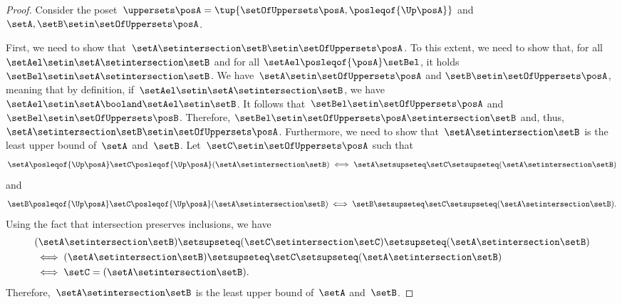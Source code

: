 \begin{proof}
    Consider the poset~$\uppersets \posA=\tup{\setOfUppersets \posA,{{\posleqof{\Up \posA}}}}$ and~$\setA,\setB\setin \setOfUppersets \posA$.

    First, we need to show that~$\setA\setintersection \setB\setin \setOfUppersets \posA$. To this extent, we need to show that, for all $\setAel \setin \setA\setintersection \setB$ and for all $\setAel \posleqof{\posA} \setBel$, it holds $\setBel \setin \setA\setintersection \setB$.
    We have~$\setA \setin \setOfUppersets \posA$ and $\setB\setin \setOfUppersets \posA$, meaning that by definition, if~$\setAel\setin \setA\setintersection \setB$, we have~$\setAel \setin \setA \booland \setAel \setin \setB$.
    It follows that~$\setBel \setin \setOfUppersets \posA$ and $\setBel \setin \setOfUppersets \posB$. Therefore, $\setBel \setin \setOfUppersets \posA \setintersection \setB$ and, thus, $\setA\setintersection \setB\setin \setOfUppersets \posA$. 
    Furthermore, we need to show that~$\setA\setintersection \setB$ is the least upper bound of~$\setA$ and~$\setB$.
    Let~$\setC\setin \setOfUppersets \posA$ such that~
\[
\setA\posleqof{\Up \posA} \setC \posleqof{\Up \posA} (\setA\setintersection \setB)
\iff
\setA\setsupseteq \setC\setsupseteq (\setA\setintersection \setB)
\]
and
\[
\setB \posleqof{\Up \posA} \setC \posleqof{\Up \posA} (\setA\setintersection \setB)
\iff
\setB\setsupseteq \setC\setsupseteq (\setA\setintersection \setB).
\]
    Using the fact that intersection preserves inclusions, we have
    \begin{equation*}
        \begin{aligned}
            &(\setA\setintersection \setB)
                                           \setsupseteq (\setC\setintersection \setC) \setsupseteq (\setA\setintersection \setB ) \\
            &\iff (\setA\setintersection \setB)  \setsupseteq \setC \setsupseteq (\setA\setintersection \setB ) \\
            &\iff\setC                          = (\setA\setintersection \setB).
        \end{aligned}
    \end{equation*}
    Therefore,~$\setA\setintersection \setB$ is the least upper bound of~$\setA$ and~$\setB$.


\end{proof}
